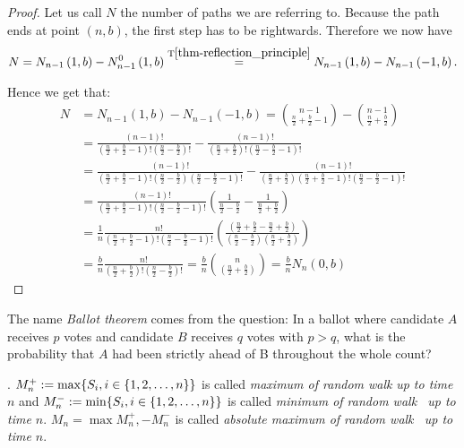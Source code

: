 \begin{proof}
 Let us call $N$ the number of paths we are referring to.
 Because the path ends at point $ \left( n,b \right) $, the first step has to be rightwards. Therefore we now have
 \[
    N=N_{n-1} \left( 1,b \right) -N_{n-1}^0 \left( 1,b \right) \overset{\text{T}\ref{thm-reflection_principle}}{=}N_{n-1} \left( 1,b \right) -N_{n-1} \left( -1,b \right).
\]


 Hence we get that:
 \[
 \begin{split}
 N & = N_{n-1} \left( 1,b \right) -N_{n-1} \left( -1,b \right)
 =\binom{n-1}{\frac{n}{2}+\frac{b}{2}-1}-\binom{n-1}{\frac{n}{2}+\frac{b}{2}}\\
 & =\frac{ \left( n-1 \right) !}{ \left( \frac{n}{2}+\frac{b}{2}-1 \right) ! \left( \frac{n}{2}-\frac{b}{2} \right) !}-\frac{ \left( n-1 \right) !}{ \left( \frac{n}{2}+\frac{b}{2} \right) ! \left( \frac{n}{2}-\frac{b}{2}-1 \right) !}\\
 & =\frac{ \left( n-1 \right) !}{ \left( \frac{n}{2}+\frac{b}{2}-1 \right) ! \left( \frac{n}{2}-\frac{b}{2} \right) \left( \frac{n}{2}-\frac{b}{2}-1 \right) !}-\frac{ \left( n-1 \right) !}{ \left( \frac{n}{2}+\frac{b}{2} \right) \left( \frac{n}{2}+\frac{b}{2}-1 \right) ! \left( \frac{n}{2}-\frac{b}{2}-1 \right) !}\\
 & =\frac{ \left( n-1 \right) !}{ \left( \frac{n}{2}+\frac{b}{2}-1 \right) ! \left( \frac{n}{2}-\frac{b}{2}-1 \right) !} \left( \frac{1}{\frac{n}{2}-\frac{b}{2}}-\frac{1}{\frac{n}{2}+\frac{b}{2}} \right) \\
 & =\frac{1}{n}\frac{n!}{ \left( \frac{n}{2}+\frac{b}{2}-1 \right) ! \left( \frac{n}{2}-\frac{b}{2}-1 \right) !} \left( \frac{ \left( \frac{n}{2}+\frac{b}{2}-\frac{n}{2}+\frac{b}{2} \right) }{ \left( \frac{n}{2}-\frac{b}{2} \right) \left( \frac{n}{2}+\frac{b}{2} \right)} \right)\\
 & =\frac{b}{n}\frac{n!}{ \left( \frac{n}{2}+\frac{b}{2} \right) ! \left( \frac{n}{2}-\frac{b}{2} \right) !}=\frac{b}{n}\binom{n}{ \left( \frac{n}{2}+\frac{b}{2} \right)}
 =\frac{b}{n}N_n \left( 0,b \right)
\end{split}
 \]
\end{proof}
 \begin{rem}
   The name \textit{Ballot theorem} comes from the question: In a ballot where candidate $A$ receives $p$ votes and candidate $B$ receives $q$ votes with $p > q$, what is the probability that $A$ had been strictly ahead of B throughout the whole count?
 \end{rem}
\begin{defn}\label{defn-max}
  \Lrw. $M_n^+:= \max \{S_i, i\in \{1,2,\ldots, n\}\}$ is called \emph{maximum of random walk \rw} \emph{up to time $n$} and $M_n^-:= \min \{S_i, i\in \{1,2,\ldots, n\}\}$ is called \emph{minimum of random walk \rw\ up to time $n.$} $M_n=\max{M_n^+, -M_n^-}$ is called \emph{absolute maximum of random walk \rw\ up to time $n.$}
\end{defn}
